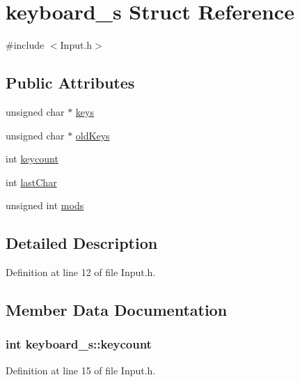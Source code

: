 \hypertarget{structkeyboard__s}{
\section{keyboard\_\-s Struct Reference}
\label{structkeyboard__s}
}


{\ttfamily \#include $<$Input.h$>$}

\subsection*{Public Attributes}
\begin{DoxyCompactItemize}
\item 
unsigned char $\ast$ \hyperlink{structkeyboard__s_a2ba5b397f8ff5edfd0f363a7df1a750b}{keys}
\item 
unsigned char $\ast$ \hyperlink{structkeyboard__s_a2a66955df8ac60c01417a021ac171220}{oldKeys}
\item 
int \hyperlink{structkeyboard__s_a576e21fc88b9ca89f7e183ad9e48f8da}{keycount}
\item 
int \hyperlink{structkeyboard__s_a873208e1bd98fd795e48585099773264}{lastChar}
\item 
unsigned int \hyperlink{structkeyboard__s_a521c6a85083a1d631259f8e5aeab8ca6}{mods}
\end{DoxyCompactItemize}


\subsection{Detailed Description}


Definition at line 12 of file Input.h.



\subsection{Member Data Documentation}
\hypertarget{structkeyboard__s_a576e21fc88b9ca89f7e183ad9e48f8da}{
\subsubsection[{keycount}]{\setlength{\rightskip}{0pt plus 5cm}int {\bf keyboard\_\-s::keycount}}}
\label{structkeyboard__s_a576e21fc88b9ca89f7e183ad9e48f8da}


Definition at line 15 of file Input.h.


